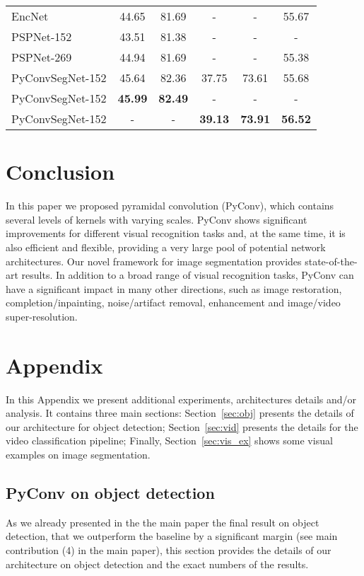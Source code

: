 \documentclass{article}
\begin{document}
\begin{table}[h]
\begin{minipage}{.4\textwidth}
{\begin{tabular}{l|cc|ccc}
EncNet~\cite{zhang2018context}& 44.65 &81.69  & - &-  &55.67 \\
\hdashline
PSPNet-152 \cite{zhao2017pyramid}&43.51  & 81.38 & - & - &- \\
PSPNet-269 \cite{zhao2017pyramid}&  44.94& 81.69 & - & - & 55.38 \\
\hline
PyConvSegNet-152 &45.64 & 82.36 & 37.75 & 73.61 & 55.68\\
PyConvSegNet-152  &{\bf45.99} & {\bf82.49} & - & - & -\\
PyConvSegNet-152  &- & - & {\bf39.13} & {\bf73.91} & {\bf 56.52}\\
\hline
\end{tabular}}
\end{minipage}
\end{table}
\addtolength{\tabcolsep}{4pt}



\section{Conclusion}
 In this paper we proposed pyramidal convolution (PyConv), which contains several levels of kernels with varying scales. PyConv shows significant improvements for different visual recognition tasks and, at the same time, it is also efficient and flexible, providing a very large pool of potential network architectures. Our novel  framework for image segmentation provides state-of-the-art results.  In addition to a broad range of visual recognition tasks, PyConv can have a significant impact in many other directions, such as  image restoration, completion/inpainting, noise/artifact removal, enhancement and image/video super-resolution. 

\appendix
\section{Appendix\label{sec:appendix}}

In this Appendix we  present additional experiments, architectures details and/or analysis.   It contains three main sections: Section~\ref{sec:obj} presents the details of our architecture for object detection; Section~\ref{sec:vid} presents the details for the video classification pipeline; Finally, Section~\ref{sec:vis_ex} shows some visual examples on image segmentation. 

\subsection{PyConv on object detection\label{sec:obj}}
As we already presented in the the main paper the final result on object detection, that we outperform the baseline by a significant margin (see main contribution (4) in the main paper), this section provides the details of our architecture on object detection and the exact numbers of the results.
\end{document}
